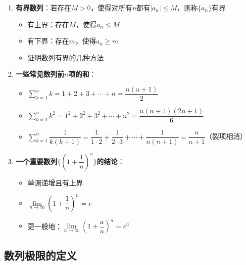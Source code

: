 \documentclass[../book.tex]{subfiles}
\begin{document}
\begin{enumerate}
        \item \textbf{有界数列}：若存在$M > 0$，使得对所有$n$都有$|a_n| \le M$，则称$\{a_n\}$有界
        \begin{itemize}
            \item 有上界：存在$M$，使得$a_n \le M$
            \item 有下界：存在$m$，使得$a_n \ge m$
            \item 证明数列有界的几种方法
        \end{itemize}

        \item \textbf{一些常见数列前$n$项的和}：
        \begin{itemize}
            \item $\displaystyle\sum_{k=1}^{n} k = 1 + 2 + 3 + \cdots + n = \dfrac{n(n+1)}{2}$
            \item $\displaystyle\sum_{k=1}^{n} k^2 = 1^2 + 2^2 + 3^2 + \cdots + n^2 = \dfrac{n(n+1)(2n+1)}{6}$
            \item $\displaystyle\sum_{k=1}^{n} \dfrac{1}{k(k+1)} = \dfrac{1}{1 \cdot 2} + \dfrac{1}{2 \cdot 3} + \cdots + \dfrac{1}{n(n+1)} = \dfrac{n}{n+1}$（裂项相消）
        \end{itemize}

        \item \textbf{一个重要数列$\{(1 + \dfrac{1}{n})^n\}$的结论}：
        \begin{itemize}
            \item 单调递增且有上界
            \item $\lim\limits_{n \to \infty} \left(1 + \dfrac{1}{n}\right)^n = e$
            \item 更一般地：$\lim\limits_{n \to \infty} \left(1 + \dfrac{a}{n}\right)^n = e^a$
        \end{itemize}
    \end{enumerate}

    \subsection{数列极限的定义}
\end{document}
